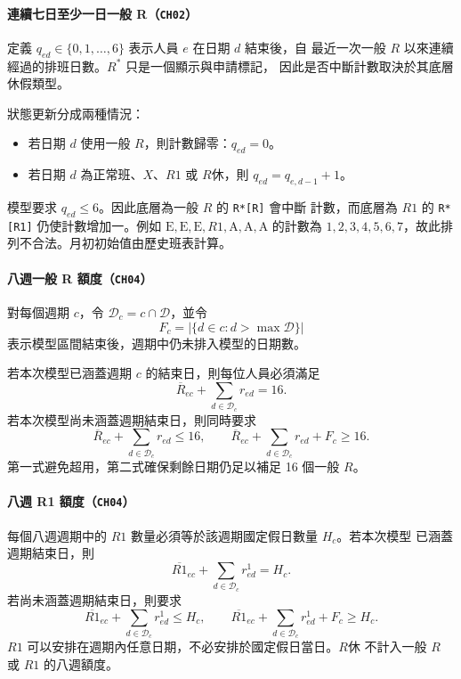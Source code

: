 \documentclass[12pt]{article}
\begin{document}
\paragraph{連續七日至少一日一般 R（\texttt{CH02}）}

定義 \(q_{ed}\in\{0,1,\ldots,6\}\) 表示人員 \(e\) 在日期 \(d\) 結束後，自
最近一次一般 \(R\) 以來連續經過的排班日數。\(R^*\) 只是一個顯示與申請標記，
因此是否中斷計數取決於其底層休假類型。

狀態更新分成兩種情況：
\begin{itemize}
  \item 若日期 \(d\) 使用一般 \(R\)，則計數歸零：\(q_{ed}=0\)。
  \item 若日期 \(d\) 為正常班、\(X\)、\(R1\) 或 \(R休\)，則
    \(q_{ed}=q_{e,d-1}+1\)。
\end{itemize}

模型要求 \(q_{ed}\leq 6\)。因此底層為一般 \(R\) 的 \texttt{R*[R]} 會中斷
計數，而底層為 \(R1\) 的 \texttt{R*[R1]} 仍使計數增加一。例如
\(\mathrm{E},\mathrm{E},\mathrm{E},R1,\mathrm{A},\mathrm{A},\mathrm{A}\) 的計數為
\(1,2,3,4,5,6,7\)，故此排列不合法。月初初始值由歷史班表計算。

\paragraph{八週一般 R 額度（\texttt{CH04}）}

對每個週期 \(c\)，令 \(\mathcal{D}_c=c\cap\mathcal{D}\)，並令
\[
  F_c=|\{d\in c:d>\max\mathcal{D}\}|
\]
表示模型區間結束後，週期中仍未排入模型的日期數。

若本次模型已涵蓋週期 \(c\) 的結束日，則每位人員必須滿足
\[
  \overline{R}_{ec}+\sum_{d\in\mathcal{D}_c}r_{ed}=16.
\]
若本次模型尚未涵蓋週期結束日，則同時要求
\[
  \overline{R}_{ec}+\sum_{d\in\mathcal{D}_c}r_{ed}\leq 16,
  \qquad
  \overline{R}_{ec}+\sum_{d\in\mathcal{D}_c}r_{ed}+F_c\geq 16.
\]
第一式避免超用，第二式確保剩餘日期仍足以補足 16 個一般 \(R\)。

\paragraph{八週 R1 額度（\texttt{CH04}）}

每個八週週期中的 \(R1\) 數量必須等於該週期國定假日數量 \(H_c\)。若本次模型
已涵蓋週期結束日，則
\[
  \overline{R1}_{ec}+\sum_{d\in\mathcal{D}_c}r^{1}_{ed}=H_c.
\]
若尚未涵蓋週期結束日，則要求
\[
  \overline{R1}_{ec}+\sum_{d\in\mathcal{D}_c}r^{1}_{ed}\leq H_c,
  \qquad
  \overline{R1}_{ec}+\sum_{d\in\mathcal{D}_c}r^{1}_{ed}+F_c\geq H_c.
\]
\(R1\) 可以安排在週期內任意日期，不必安排於國定假日當日。\(R休\) 不計入一般 \(R\) 或 \(R1\) 的八週額度。
\end{document}
